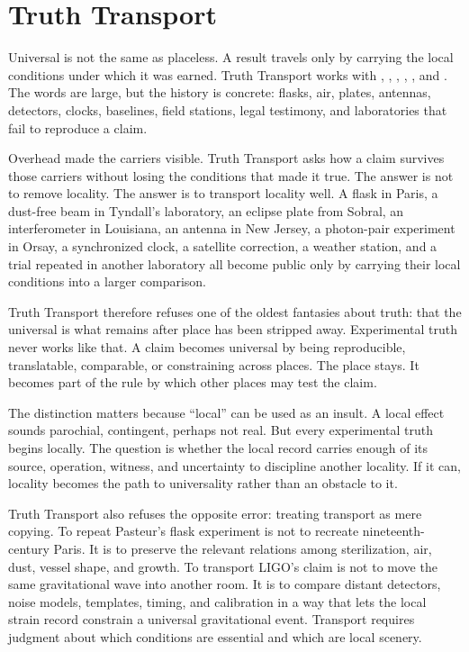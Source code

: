 \chapter{Truth Transport}
\label{chap:truth-transport}

\begin{chapteressay}
Universal is not the same as placeless. A result travels only by carrying the
local conditions under which it was earned. Truth Transport works with
, , , , ,
and . The words are large, but the history is concrete:
flasks, air, plates, antennas, detectors, clocks, baselines, field stations,
legal testimony, and laboratories that fail to reproduce a claim.

Overhead made the carriers visible. Truth Transport asks how a claim survives
those carriers without losing the conditions that made it true. The answer is
not to remove locality. The answer is to transport locality well. A flask in
Paris, a dust-free beam in Tyndall's laboratory, an eclipse plate from Sobral,
an interferometer in Louisiana, an antenna in New Jersey, a photon-pair
experiment in Orsay, a synchronized clock, a satellite correction, a weather
station, and a trial repeated in another laboratory all become public only by
carrying their local conditions into a larger comparison.

Truth Transport therefore refuses one of the oldest fantasies about truth:
that the universal is what remains after place has been stripped away.
Experimental truth never works like that. A claim becomes universal by being
reproducible, translatable, comparable, or constraining across places. The
place stays. It becomes part of the rule by which other places may test the
claim.

The distinction matters because ``local'' can be used as an insult. A local
effect sounds parochial, contingent, perhaps not real. But every experimental
truth begins locally. The question is whether the local record carries enough
of its source, operation, witness, and uncertainty to discipline another
locality. If it can, locality becomes the path to universality rather than an
obstacle to it.

Truth Transport also refuses the opposite error: treating transport as mere
copying. To repeat Pasteur's flask experiment is not to recreate
nineteenth-century Paris. It is to preserve the relevant relations among
sterilization, air, dust, vessel shape, and growth. To transport LIGO's claim
is not to move the same gravitational wave into another room. It is to compare
distant detectors, noise models, templates, timing, and calibration in a way
that lets the local strain record constrain a universal gravitational event.
Transport requires judgment about which conditions are essential and which are
local scenery.


\end{chapteressay}
